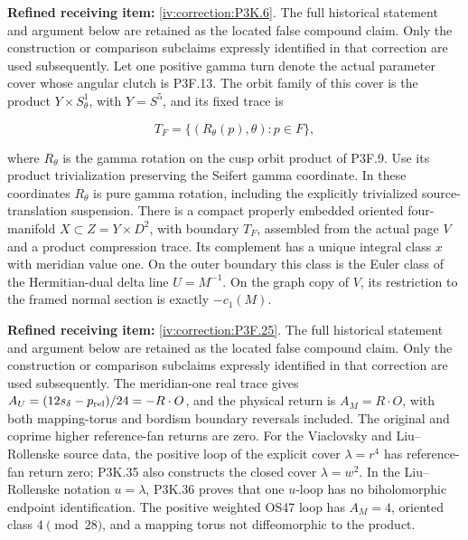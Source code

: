 \begin{theorem}\hypertarget{tag-02V6}{}\label{night:P3K.6}

\par\noindent\textbf{Refined receiving item:} \cref{iv:correction:P3K.6}. The full historical statement and argument below are retained as the located false compound claim. Only the construction or comparison subclaims expressly identified in that correction are used subsequently.
Let one positive gamma turn denote the actual parameter cover whose
angular clutch is P3F.13.  The orbit family of this cover is the product
\(Y\times S^1_\theta\), with \(Y=S^5\), and its fixed trace is

\[
 T_F=\{(R_\theta(p),\theta):p\in F\},
\]

where \(R_\theta\) is the gamma rotation on the cusp orbit product of
P3F.9.  Use its product trivialization preserving the Seifert gamma
coordinate.  In these coordinates \(R_\theta\) is pure gamma
rotation, including the explicitly trivialized source-translation
suspension.  There is a compact properly embedded oriented four-manifold
\(X\subset Z=Y\times D^2\), with boundary \(T_F\), assembled from the
actual page \(V\) and a product compression trace.  Its complement
has a unique integral class \(x\) with meridian value one.  On the
outer boundary this class is the Euler class of the Hermitian-dual delta line $U=M^{-1}$.
On the graph copy of \(V\), its restriction to the framed normal
section is exactly \(-c_1(M)\).
\end{theorem}

\begin{theorem}\hypertarget{tag-02S1}{}\label{night:P3F.25}

\par\noindent\textbf{Refined receiving item:} \cref{iv:correction:P3F.25}. The full historical statement and argument below are retained as the located false compound claim. Only the construction or comparison subclaims expressly identified in that correction are used subsequently.
The meridian-one real trace gives $A_U=(12s_\delta-p_{\rm rel})/24=-R\cdot O$, and the physical return is $A_M=R\cdot O$, with both mapping-torus and bordism boundary reversals included. The original and coprime higher reference-fan returns are zero. For the Viaclovsky and Liu--Rollenske source data, the positive loop of the explicit cover $\lambda=r^4$ has reference-fan return zero; P3K.35 also constructs the closed cover $\lambda=w^2$. In the Liu--Rollenske notation $u=\lambda$, P3K.36 proves that one $u$-loop has no biholomorphic endpoint identification. The positive weighted OS47 loop has $A_M=4$, oriented class $4\pmod{28}$, and a mapping torus not diffeomorphic to the product.
\end{theorem}

